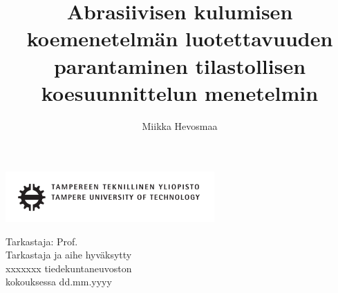 \documentclass[12pt,a4paper,finnish]{tutthesis}
\author{Miikka Hevosmaa}
\title{Abrasiivisen kulumisen koemenetelmän luotettavuuden parantaminen tilastollisen koesuunnittelun menetelmin}      %
\begin{document}
\thispagestyle{empty}
\vspace*{-1cm}\noindent
\includegraphics[width=8cm]{tty_tut_logo}   %



\vspace{6.8cm}
\maketitle
\vspace{6.cm} %

\begin{flushright}  
  \begin{minipage}[c]{6.8cm}
    \begin{spacing}{1.0}
      \textsf{Tarkastaja: Prof. \@examiner}\\
      \textsf{Tarkastaja ja aihe hyväksytty}\\ 
      \textsf{xxxxxxx tiedekuntaneuvoston}\\
      \textsf{kokouksessa dd.mm.yyyy}\\
    \end{spacing}
  \end{minipage}
\end{flushright}

\if@twoside
\clearpage
\fi



\setcounter{page}{0} %
\end{document}
